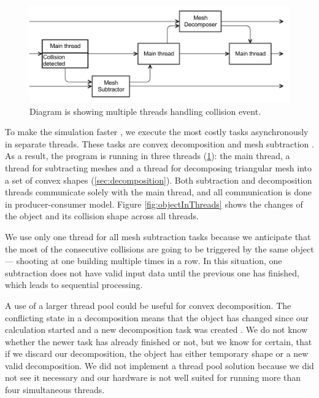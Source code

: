 \begin{figure}
        \centering
        \includegraphics[width=\textwidth]{img/decompositionFlow}
        \caption{Diagram is showing multiple threads handling collision event. }
        \label{fig:threads}
\end{figure}
To make the simulation faster , we execute the most costly tasks asynchronously in separate threads. These tasks are convex decomposition and mesh subtraction . As a result, the program is running in three threads (\cref{fig:threads}): the main thread, a thread for subtracting meshes and a thread for decomposing triangular mesh into a set of convex shapes (\cref{sec:decomposition}). Both subtraction and decomposition threads communicate solely with the main thread, and all communication is done in producer-consumer model. Figure \ref{fig:objectInThreads} shows the changes of the object and its collision shape across all threads.

We use only one thread for all mesh subtraction tasks because we anticipate that the most of the consecutive collisions are going to be triggered by the same object --- shooting at one building multiple times in a row. In this situation, one subtraction does not have valid input data until the previous one has finished, which leads to sequential processing. 

A use of a larger thread pool could be useful for convex decomposition. The conflicting state in a decomposition means that the object has changed since our calculation started and a new decomposition task was created . We do not know whether the newer task has already finished or not, but we know for certain, that if we discard our decomposition, the object has either temporary shape or a new valid decomposition. We did not implement a thread pool solution because we did not see it necessary and our hardware  is not well suited for running more than four simultaneous threads.

